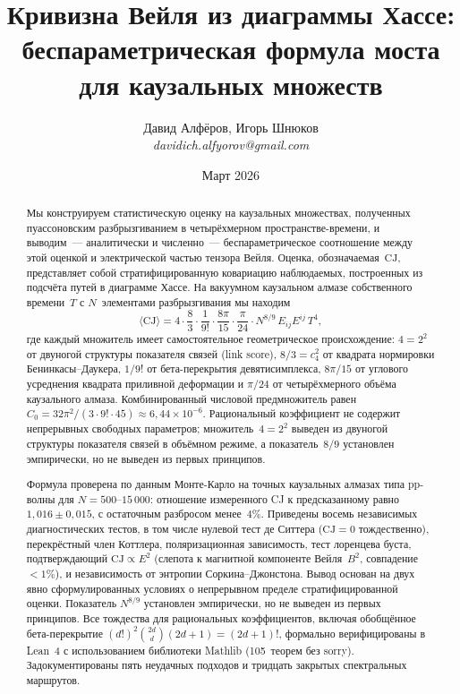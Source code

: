 \documentclass[12pt,a4paper]{article}
\title{Кривизна Вейля из диаграммы Хассе:\\
беспараметрическая формула моста для каузальных множеств}
\author{Давид Алфёров, Игорь Шнюков\\[4pt]
\small\textit{davidich.alfyorov@gmail.com}}
\date{Март 2026}
\theoremstyle{plain}
\theoremstyle{definition}
\theoremstyle{remark}
\newcommand{\Esq}{E_{ij}E^{ij}}
\newcommand{\CJ}{\mathrm{CJ}}
\begin{document}
\maketitle

\begin{abstract}

Мы конструируем статистическую оценку на каузальных множествах,
полученных пуассоновским разбрызгиванием в четырёхмерном
пространстве-времени, и выводим~--- аналитически и
численно~--- беспараметрическое соотношение между этой
оценкой и электрической частью тензора Вейля.  Оценка,
обозначаемая~$\CJ$, представляет собой стратифицированную
ковариацию наблюдаемых, построенных из подсчёта путей в
диаграмме Хассе.  На вакуумном каузальном алмазе собственного
времени~$T$ с $N$~элементами разбрызгивания мы находим
\begin{equation}\label{eq:bridge-abstract}
  \langle \CJ \rangle
  = 4 \cdot \frac{8}{3} \cdot \frac{1}{9!}
    \cdot \frac{8\pi}{15} \cdot \frac{\pi}{24}
    \cdot N^{8/9}\, \Esq\, T^4,
\end{equation}
где каждый множитель имеет самостоятельное геометрическое
происхождение: $4 = 2^2$ от двуногой структуры показателя
связей (link score), $8/3 = c_4^2$ от квадрата нормировки
Бенинкасы--Даукера, $1/9!$ от бета-перекрытия
девятисимплекса, $8\pi/15$ от углового усреднения квадрата
приливной деформации и $\pi/24$ от четырёхмерного объёма
каузального алмаза.  Комбинированный числовой предмножитель
равен $C_0 = 32\pi^2/(3 \cdot 9! \cdot 45)
\approx 6{,}44 \times 10^{-6}$.  Рациональный коэффициент
не содержит непрерывных свободных параметров; множитель~$4 = 2^2$
выведен из двуногой структуры показателя связей в объёмном
режиме, а показатель~$8/9$ установлен эмпирически, но не
выведен из первых принципов.

Формула проверена по данным Монте-Карло на точных каузальных
алмазах типа pp-волны для $N = 500$--$15\,000$: отношение
измеренного CJ к предсказанному равно $1{,}016 \pm 0{,}015$,
с остаточным разбросом менее~$4\%$.  Приведены восемь независимых
диагностических тестов, в том числе нулевой тест де Ситтера
($\CJ = 0$ тождественно), перекрёстный член Коттлера,
поляризационная зависимость, тест лоренцева буста,
подтверждающий $\CJ \propto E^2$ (слепота к магнитной
компоненте Вейля~$B^2$, совпадение $< 1\%$),
и независимость от энтропии Соркина--Джонстона.  Вывод основан на двух явно
сформулированных условиях о непрерывном пределе
стратифицированной оценки.  Показатель $N^{8/9}$ установлен
эмпирически, но не выведен из первых принципов.  Все
тождества для рациональных коэффициентов, включая обобщённое
бета-перекрытие
$(d!)^2\binom{2d}{d}(2d+1) = (2d+1)!$, формально верифицированы
в Lean~4 с использованием библиотеки Mathlib (105~теорем
без sorry).  Задокументированы пять неудачных подходов и
тридцать закрытых спектральных маршрутов.

\end{abstract}
\end{document}
